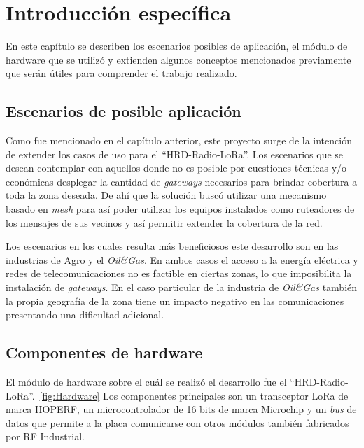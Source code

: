 \chapter{Introducción específica} %

\label{Chapter2}


En este capítulo se describen los escenarios posibles de aplicación, el módulo de hardware que se utilizó y extienden algunos conceptos mencionados previamente que serán útiles para comprender el trabajo realizado.

\section{Escenarios de posible aplicación}

Como fue mencionado en el capítulo anterior, este proyecto surge de la intención de extender los casos de uso para el “HRD-Radio-LoRa”. Los escenarios que se desean contemplar con aquellos donde no es posible por cuestiones técnicas y/o económicas desplegar la cantidad de \emph{gateways}  necesarios para brindar cobertura a toda la zona deseada. De ahí que la solución buscó utilizar una mecanismo basado en \emph{mesh} para así poder utilizar los equipos instalados como ruteadores de los mensajes de sus vecinos y así permitir extender la cobertura de la red.

Los escenarios en los cuales resulta más beneficiosos este desarrollo son en las industrias de Agro y el \emph{Oil\&Gas}. En ambos casos el acceso a la energía eléctrica y redes de telecomunicaciones no es factible en ciertas zonas, lo que imposibilita la instalación de \emph{gateways}. En el caso particular de la industria de \emph{Oil\&Gas} también la propia geografía de la zona tiene un impacto negativo en las comunicaciones presentando una dificultad adicional. 


\section{Componentes de hardware}

El módulo de hardware sobre el cuál se realizó el desarrollo fue el “HRD-Radio-LoRa”.~\ref{fig:Hardware} \citep{WEBSITE:5} Los componentes principales son un transceptor LoRa de marca HOPERF, un microcontrolador de 16 bits de marca Microchip y un \emph{bus} de datos que permite a la placa comunicarse con otros módulos también fabricados por RF Industrial.


